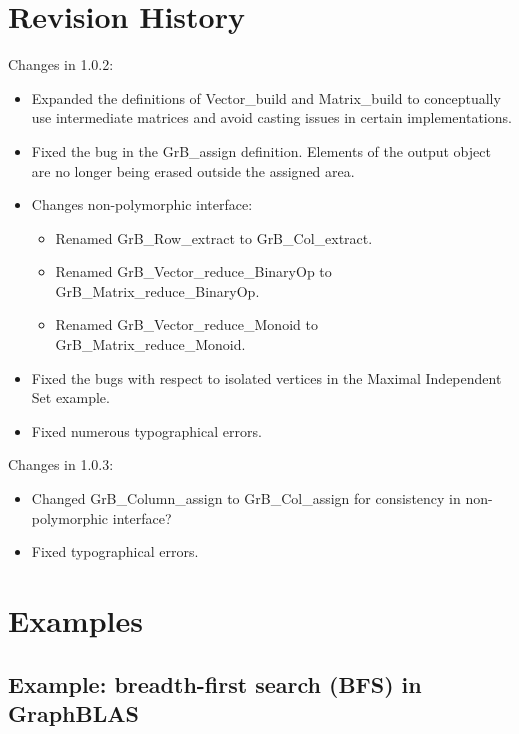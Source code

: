 \chapter{Revision History}
Changes in 1.0.2:
\begin{itemize}
\item Expanded the definitions of {\sf Vector\_build} and {\sf Matrix\_build} to conceptually use intermediate matrices and avoid casting issues in certain implementations.
\item Fixed the bug in the {\sf GrB\_assign} definition. Elements of the output object are no longer being erased outside the assigned area.
\item Changes non-polymorphic interface:
    \begin{itemize}
    \item Renamed {\sf GrB\_Row\_extract} to {\sf GrB\_Col\_extract}.
    \item Renamed {\sf GrB\_Vector\_reduce\_BinaryOp} to {\sf GrB\_Matrix\_reduce\_BinaryOp}.
    \item Renamed {\sf GrB\_Vector\_reduce\_Monoid} to {\sf GrB\_Matrix\_reduce\_Monoid}.
    \end{itemize}
\item Fixed the bugs with respect to isolated vertices in the Maximal Independent Set example.
\item Fixed numerous typographical errors.
\end{itemize}  

Changes in 1.0.3:
\begin{itemize}
\item Changed {\sf GrB\_Column\_assign} to {\sf GrB\_Col\_assign} for consistency in non-polymorphic interface?
\item Fixed typographical errors.
\end{itemize}  

\chapter{Examples}
\label{Chp:Examples}

\pagebreak
\nolinenumbers
\section{Example: breadth-first search (BFS) in GraphBLAS}
{\scriptsize

}

